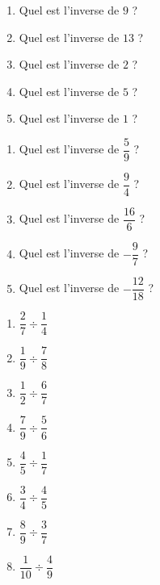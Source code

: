 \documentclass[11pt]{article}
\begin{document}
\begin{multicols}{2}
\begin{exercice}[1]
\begin{enumerate}[itemsep=2em]
\item Quel est l'inverse de $9$ ?
\item Quel est l'inverse de $13$ ?
\item Quel est l'inverse de $2$ ?
\item Quel est l'inverse de $5$ ?
\item Quel est l'inverse de $1$ ?
\end{enumerate}
\end{exercice}


\begin{exercice}[1]
\begin{enumerate}[itemsep=2em]
\item Quel est l'inverse de $\dfrac{5}{9}$ ?
\item Quel est l'inverse de $\dfrac{9}{4}$ ?
\item Quel est l'inverse de $\dfrac{16}{6}$ ?
\item Quel est l'inverse de $-\dfrac{9}{7}$ ?
\item Quel est l'inverse de $-\dfrac{12}{18}$ ?
\end{enumerate}
\end{exercice}
\end{multicols}

\begin{exercice}[1]
\begin{multicols}{2}
\begin{enumerate}[itemsep=2em]
	\item  $\dfrac{2}{7}\div\dfrac{1}{4}$ 
	\item  $\dfrac{1}{9}\div\dfrac{7}{8}$ 
	\item  $\dfrac{1}{2}\div\dfrac{6}{7}$ 
	\item  $\dfrac{7}{9}\div\dfrac{5}{6}$ 
	\item  $\dfrac{4}{5}\div\dfrac{1}{7}$ 
	\item  $\dfrac{3}{4}\div\dfrac{4}{5}$ 
	\item  $\dfrac{8}{9}\div\dfrac{3}{7}$ 
	\item  $\dfrac{1}{10}\div\dfrac{4}{9}$ 
\end{enumerate}
\end{multicols}
\end{exercice}
\end{document}
